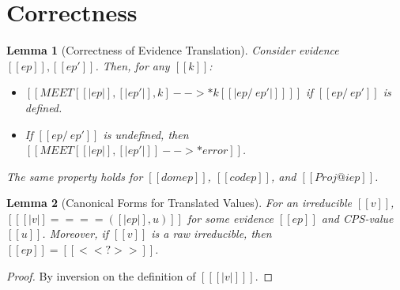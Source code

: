 \documentclass[11pt]{article}
\newtheorem{lemma}{Lemma}[section]
\begin{document}
\section{Correctness}

\begin{lemma}[Correctness of Evidence Translation]
	\label{lem:ev-correct}
	Consider evidence $[[ep]],[[ep']]$. Then, for any $[[k]]$:
	\begin{itemize}
		\item $[[MEET[ [|ep|], [|ep'|], k ] -->* k[ [| ep /\ ep' |] ] ]]$ if $[[ep /\ ep']]$ is defined.
		\item If $[[ep /\ ep']]$ is undefined, then $[[MEET[ [|ep|], [|ep'|] ] -->* error ]]$.
	\end{itemize}
	The same property holds for $[[dom ep]]$, $[[cod ep]]$, and $[[Proj@i ep]]$.
\end{lemma}

\begin{lemma}[Canonical Forms for Translated Values]
	\label{lem:canonical-trans}
	For an irreducible $[[v]]$, $[[ [|v|] ==== ( [|ep|], u) ]] $ for some evidence $[[ep]]$ and CPS-value $[[u]]$.
	Moreover, if $[[v]]$ is a raw irreducible, then $[[ep]]=[[<<?>>]]$.
\end{lemma}
\begin{proof}
	By inversion on the definition of $[[ [|v|] ]]$.
\end{proof}
\end{document}
